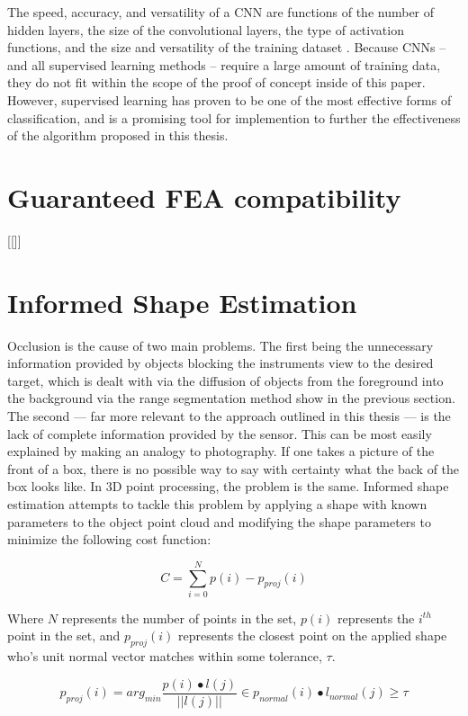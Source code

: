\documentclass[12pt]{drexelthesis}
\let\Oldsection\section
\renewcommand{\section}{\FloatBarrier\Oldsection}
\begin{document}
The speed, accuracy, and versatility of a CNN are functions of the number of hidden layers, the size of the convolutional layers, the type of activation functions, and the size and versatility of the training dataset \cite{RN7}. Because CNNs -- and all supervised learning methods -- require a large amount of training data, they do not fit within the scope of the proof of concept inside of this paper. However, supervised learning has proven to be one of the most effective forms of classification, and is a promising tool for implemention to further the effectiveness of the algorithm proposed in this thesis.

\section{Guaranteed FEA compatibility}
[[]]

\section{Informed Shape Estimation}
\label{subsubsec:informedshape}
Occlusion is the cause of two main problems. The first being the unnecessary information provided by objects blocking the instruments view to the desired target, which is dealt with via the diffusion of objects from the foreground into the background via the range segmentation method show in the previous section. The second --- far more relevant to the approach outlined in this thesis --- is the lack of complete information provided by the sensor. This can be most easily explained by making an analogy to photography. If one takes a picture of the front of a box, there is no possible way to say with certainty what the back of the box looks like. In 3D point processing, the problem is the same. Informed shape estimation attempts to tackle this problem by applying a shape with known parameters to the object point cloud and modifying the shape parameters to minimize the following cost function:

\begin{equation}
	C = \sum_{i=0}^{N}{p(i) - p_{proj}(i)}
\end{equation}

Where $N$ represents the number of points in the set, $p(i)$ represents the $i^{th}$ point in the set, and $p_{proj}(i)$ represents the closest point on the applied shape who's unit normal vector matches within some tolerance, $\tau$.

\begin{equation}
	p_{proj}(i) = arg_{min} \frac{p(i) \bullet l(j)}{||l(j)||} \in p_{normal}(i) \bullet l_{normal}(j) \geq \tau
\end{equation}
\end{document}
